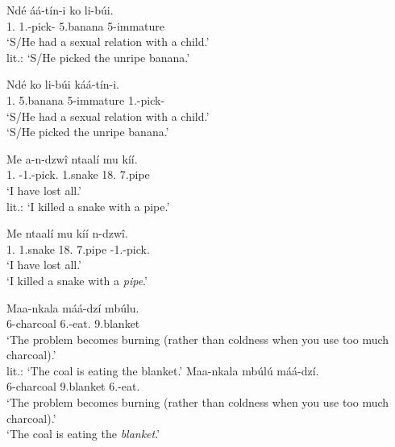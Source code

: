 \documentclass[output=paper,colorlinks,citecolor=brown,
]{langscibook}
\begin{document}
\begin{exe}
     \ex \label{69}
    \begin{xlist}
\ex
\label{69a}
\gll
Ndé áá-tín-i ko li-búi.\\
1.\Pro{} 1\Sm{}.\Pst{}-pick-\Pst{} 5.banana 5-immature\\
\trans ‘S/He had a sexual relation with a child.’\\
    lit.: `S/He picked the unripe banana.'

\ex
\label{69b}
\gll
Ndé ko li-búi káá-tín-i.\\
1.\Pro{} 5.banana 5-immature 1\Sm{}.\Pst{}-pick-\Pst{}\\
\trans *‘S/He had a sexual relation with a child.’\\
    `S/He picked the unripe banana.'

    \end{xlist}
\end{exe}
\begin{exe}
     \ex \label{70}
    \begin{xlist}
\ex
\label{70a}
\gll
Me a-n-dzw\^{i} ntaalí mu kíí.\\
1\Sg{}.\Pro{} \Pst{}-1\Sg{}.\Sm{}-pick.\Pst{} 1.snake 18.\Loc{} 7.pipe\\
\trans ‘I have lost all.’\\
    lit.: `I killed a snake with a pipe.'

\ex
\label{70b}
\gll
Me ntaalí mu kíí n-dzw\^{i}.\\
1\Sg{}.\Pro{} 1.snake 18.\Loc{} 7.pipe \Pst{}-1\Sg{}.\Sm{}-pick.\Pst{}\\
\trans *‘I have lost all.’\\
    `I killed a snake with a \textit{pipe}.'

    \end{xlist}
\end{exe}
\begin{exe}
     \ex \label{71}
    \begin{xlist}
\ex
\label{71a}
\gll
Maa-nkala máá-dzí mbúlu.\\
6-charcoal 6\Sm{}.\Pst{}-eat.\Pst{} 9.blanket\\
\trans ‘The problem becomes burning (rather than coldness when you use too much charcoal).’\\
    lit.: `The coal is eating the blanket.'
\ex
\label{71b}
\gll
Maa-nkala mbúlú máá-dzí.\\
6-charcoal 9.blanket 6\Sm{}.\Pst{}-eat.\Pst{}\\
\trans *‘The problem becomes burning (rather than coldness when you use too much charcoal).’\\

    `The coal is eating the \textit{blanket}.'
    \end{xlist}
\end{exe}
\end{document}
